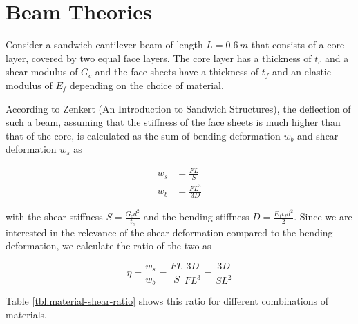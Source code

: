

\newpage
\section{Beam Theories}

Consider a sandwich cantilever beam of length $L = 0.6\,\unit{m}$ that consists of a core layer, covered by two equal face layers.
The core layer has a thickness of $t_c$ and a shear modulus of $G_c$ and the face sheets have a thickness of $t_f$ and an elastic modulus of $E_f$ depending on the choice of material.

According to Zenkert (An Introduction to Sandwich Structures), the deflection of such a beam, assuming that the stiffness of the face sheets is much higher than that of the core, is calculated as the sum of bending deformation $w_b$ and shear deformation $w_s$ as

\begin{align}
w_s &= \frac{FL}{S} \\
w_b &= \frac{FL^3}{3D}
\end{align}

with the shear stiffness $S = \frac{G_c d^2}{t_c}$ and the bending stiffness $D = \frac{E_f t_f d^2}{2}$.
Since we are interested in the relevance of the shear deformation compared to the bending deformation, we calculate the ratio of the two as

\begin{equation}
\eta = \frac{w_s}{w_b} = \frac{FL}{S}\frac{3D}{FL^3} = \frac{3D}{SL^2}
\end{equation}

Table \ref{tbl:material-shear-ratio} shows this ratio for different combinations of materials.

